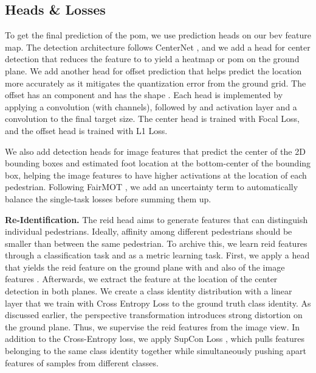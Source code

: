 \documentclass[10pt,twocolumn,letterpaper]{article}
\newcommand{\nparagraph}[1]{\noindent\textbf{#1.  }}
\begin{document}
{\subsection{Heads \& Losses}
To get the final prediction of the \gls{pom}, we use prediction heads on our \gls{bev} feature map. The detection architecture follows CenterNet \cite{zhou2019objects}, and we add a head for center detection that reduces the feature to  to yield a heatmap or \gls{pom} on the ground plane. We add another head for offset prediction that helps predict the location more accurately as it mitigates the quantization error from the ground grid. The offset has an  component and has the shape  . Each head is implemented by applying a  convolution (with  channels), followed by and activation layer and a  convolution to the final target size. The center head is trained with Focal Loss, and the offset head is trained with L1 Loss.

We also add detection heads for image features that predict the center of the 2D bounding boxes and estimated foot location at the bottom-center of the bounding box, helping the image features to have higher activations at the location of each pedestrian.
Following FairMOT \cite{zhang2021fairmot}, we add an uncertainty term to automatically balance the single-task losses before summing them up.

\nparagraph{Re-Identification}
The \gls{reid} head aims to generate features that can distinguish individual pedestrians. Ideally, affinity among different pedestrians should be smaller than between the same pedestrian. To archive this, we learn \gls{reid} features through a classification task and as a metric learning task. First, we apply a head that yields the \gls{reid} feature on the ground plane  with  and also of the image features . Afterwards, we extract the feature at the location of the center detection in both planes. We create a class identity distribution with a linear layer that we train with Cross Entropy Loss to the ground truth class identity. As discussed earlier, the perspective transformation introduces strong distortion on the ground plane. Thus, we supervise the \gls{reid} features from the image view. In addition to the Cross-Entropy loss, we apply SupCon Loss \cite{khosla2020supervised}, which pulls features belonging to the same class identity together while simultaneously pushing apart features of samples from different classes.

}
\end{document}
